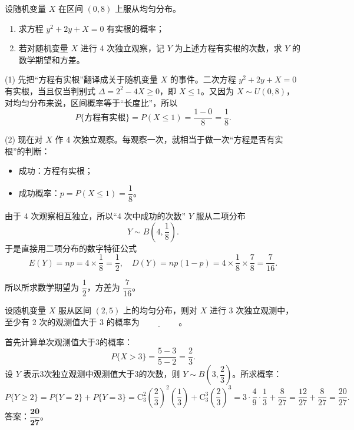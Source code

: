 ﻿\documentclass[lang=cn,11pt]{elegantbook}
\begin{document}
\begin{exercise}\label{exer:2-29}
设随机变量 $X$ 在区间 $(0,8)$ 上服从均匀分布。
\begin{enumerate}
    \item[(1)] 求方程 $y^2 + 2y + X = 0$ 有实根的概率；
    \item[(2)] 若对随机变量 $X$ 进行 4 次独立观察，记 $Y$ 为上述方程有实根的次数，求 $Y$ 的数学期望和方差。
\end{enumerate}
\end{exercise}
\begin{solution}
(1) 先把“方程有实根”翻译成关于随机变量 \(X\) 的事件。二次方程 \(y^2+2y+X=0\) 有实根，当且仅当判别式 \(\Delta=2^2-4X\ge 0\)，即 \(X\le 1\)。又因为 \(X\sim U(0,8)\)，对均匀分布来说，区间概率等于“长度比”，所以
\[
P\{\text{方程有实根}\}=P(X\le 1)=\frac{1-0}{8}=\frac{1}{8}.
\]

(2) 现在对 \(X\) 作 4 次独立观察。每观察一次，就相当于做一次“方程是否有实根”的判断：
\begin{itemize}
    \item 成功：方程有实根；
    \item 成功概率：\(p=P(X\le 1)=\dfrac18\)。
\end{itemize}
由于 4 次观察相互独立，所以“4 次中成功的次数” \(Y\) 服从二项分布
\[
Y\sim B\!\left(4,\frac18\right).
\]
于是直接用二项分布的数字特征公式
\[
E(Y) = np = 4 \times \frac{1}{8} = \frac{1}{2}, \quad D(Y) = np(1-p) = 4 \times \frac{1}{8} \times \frac{7}{8} = \frac{7}{16}.
\]

所以所求数学期望为 \(\dfrac12\)，方差为 \(\dfrac{7}{16}\)。
\end{solution}


\begin{exercise}[均匀分布与二项分布结合] \label{exer:2-40}
设随机变量 $X$ 服从区间 $(2,5)$ 上的均匀分布，则对 $X$ 进行 3 次独立观测中，至少有 2 次的观测值大于 3 的概率为$\underline{\hspace{2cm}}$。
\end{exercise}
\begin{solution}
首先计算单次观测值大于3的概率：
\[
P\{X>3\} = \frac{5-3}{5-2} = \frac{2}{3}.
\]
设 $Y$ 表示3次独立观测中观测值大于3的次数，则 $Y\sim B\left(3,\dfrac{2}{3}\right)$。所求概率：
\[
P\{Y\geqslant2\} = P\{Y=2\} + P\{Y=3\} = \mathrm{C}_3^2\left(\frac{2}{3}\right)^2\left(\frac{1}{3}\right) + \mathrm{C}_3^3\left(\frac{2}{3}\right)^3 = 3\cdot\frac{4}{9}\cdot\frac{1}{3} + \frac{8}{27} = \frac{12}{27} + \frac{8}{27} = \frac{20}{27}.
\]
答案：$\boldsymbol{\dfrac{20}{27}}$。
\end{solution}
\end{document}
